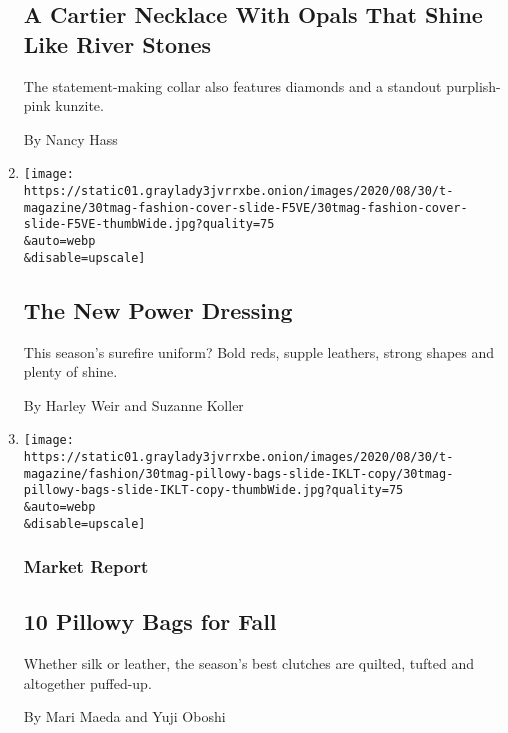\begin{enumerate}
{  \subsection{A Cartier Necklace With Opals That Shine Like River
  Stones}\label{a-cartier-necklace-with-opals-that-shine-like-river-stones}}

  The statement-making collar also features diamonds and a standout
  purplish-pink kunzite.

  By Nancy Hass
\item
  \href{/2020/08/26/t-magazine/fall-womens-fashion-cover.html}{}

  \texttt{[image: https://static01.graylady3jvrrxbe.onion/images/2020/08/30/t-magazine/30tmag-fashion-cover-slide-F5VE/30tmag-fashion-cover-slide-F5VE-thumbWide.jpg?quality=75\\\&auto=webp\\\&disable=upscale]}

  \hypertarget{the-new-power-dressing}{%
  \subsection{The New Power Dressing}\label{the-new-power-dressing}}

  This season's surefire uniform? Bold reds, supple leathers, strong
  shapes and plenty of shine.

  By Harley Weir and Suzanne Koller
\item
  \href{/2020/08/25/t-magazine/fall-bags-pillowy-clutches-accessories.html}{}

  \texttt{[image: https://static01.graylady3jvrrxbe.onion/images/2020/08/30/t-magazine/fashion/30tmag-pillowy-bags-slide-IKLT-copy/30tmag-pillowy-bags-slide-IKLT-copy-thumbWide.jpg?quality=75\\\&auto=webp\\\&disable=upscale]}

  \hypertarget{market-report}{%
  \subsubsection{Market Report}\label{market-report}}

  \hypertarget{10-pillowy-bags-for-fall}{%
  \subsection{10 Pillowy Bags for Fall}\label{10-pillowy-bags-for-fall}}

  Whether silk or leather, the season's best clutches are quilted,
  tufted and altogether puffed-up.

  By Mari Maeda and Yuji Oboshi
\end{enumerate}

